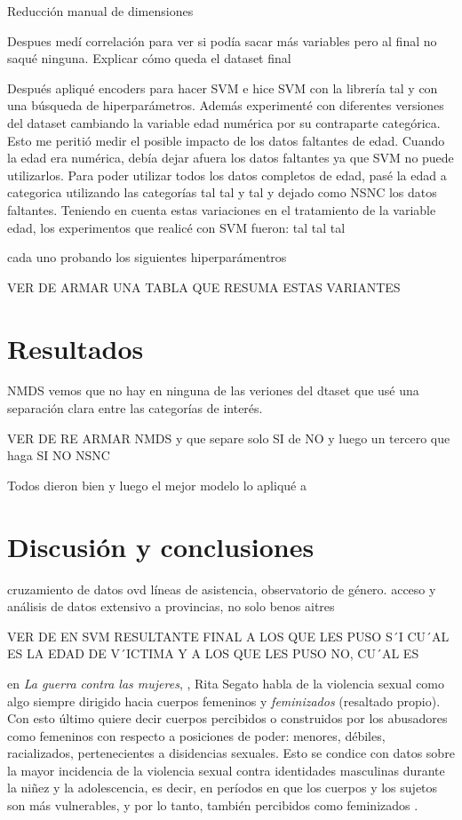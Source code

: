 \documentclass[10 pt]{article}
\begin{document}
Reducción manual de dimensiones


Despues medí correlación para ver si podía sacar más variables pero al final no saqué ninguna. Explicar cómo queda el dataset final

Después apliqué encoders para hacer SVM e hice SVM con la librería tal y con una búsqueda de hiperparámetros. Además experimenté con diferentes versiones del dataset cambiando la variable edad numérica por su contraparte categórica. Esto me peritió medir el posible impacto de los datos faltantes de edad. Cuando la edad era numérica, debía dejar afuera los datos faltantes ya que SVM no puede utilizarlos. Para poder utilizar todos los datos completos de edad, pasé la edad a categorica  utilizando las categorías tal tal y tal y dejado como NSNC los datos faltantes. Teniendo en cuenta estas variaciones en el tratamiento de la variable edad, los experimentos que realicé con SVM fueron: 
tal tal tal

cada uno probando los siguientes hiperparámentros

VER DE ARMAR UNA TABLA QUE RESUMA ESTAS VARIANTES 


\section*{Resultados}\label{resultados}
NMDS vemos que no hay en ninguna de las veriones del dtaset que usé una separación clara entre las categorías de interés.

VER DE RE ARMAR NMDS y que separe solo SI de NO y luego un tercero que haga SI NO NSNC

Todos dieron bien y luego el mejor modelo lo apliqué a 

\section*{Discusión y conclusiones}\label{conc}
cruzamiento de datos ovd líneas de asistencia, observatorio de género.
acceso y análisis de datos extensivo a provincias, no solo benos aitres


VER DE EN SVM RESULTANTE FINAL A LOS QUE LES PUSO S´I CU´AL ES LA EDAD DE V´ICTIMA Y A LOS QUE LES PUSO NO, CU´AL ES

en \textit{La guerra contra las mujeres}, \citeyearpar{segato2016guerra}, Rita Segato habla de la violencia sexual como algo siempre dirigido hacia cuerpos femeninos y \textit{feminizados} (resaltado propio). Con esto último quiere decir cuerpos percibidos o construidos por los abusadores como femeninos con respecto a posiciones de poder: menores, débiles, racializados, pertenecientes a disidencias sexuales. Esto se condice con datos sobre la mayor incidencia de la violencia sexual contra identidades masculinas durante la niñez y la adolescencia, es decir, en períodos en que los cuerpos y los sujetos son más vulnerables, y por lo tanto, también percibidos como feminizados \citep*{contreras2016violencia,ufem_relevamiento,ferris2002world}.
\end{document}
